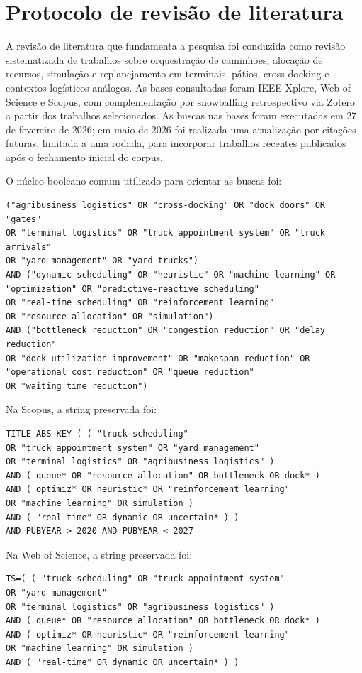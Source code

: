 \documentclass[
  12pt,
  oneside,
  a4paper,
  sumario=tradicional,
  brazil
]{abntex2}
\begin{document}
\section{Protocolo de revisão de literatura}
A revis\~ao de literatura que fundamenta a pesquisa foi conduzida como revis\~ao sistematizada de trabalhos sobre orquestra\c{c}\~ao de caminh\~oes, aloca\c{c}\~ao de recursos, simula\c{c}\~ao e replanejamento em terminais, p\'atios, cross-docking e contextos log\'isticos an\'alogos. As bases consultadas foram IEEE Xplore, Web of Science e Scopus, com complementa\c{c}\~ao por snowballing retrospectivo via Zotero a partir dos trabalhos selecionados. As buscas nas bases foram executadas em 27 de fevereiro de 2026; em maio de 2026 foi realizada uma atualiza\c{c}\~ao por cita\c{c}\~oes futuras, limitada a uma rodada, para incorporar trabalhos recentes publicados ap\'os o fechamento inicial do corpus.

O n\'ucleo booleano comum utilizado para orientar as buscas foi:
{\scriptsize
\begin{verbatim}
("agribusiness logistics" OR "cross-docking" OR "dock doors" OR "gates"
OR "terminal logistics" OR "truck appointment system" OR "truck arrivals"
OR "yard management" OR "yard trucks")
AND ("dynamic scheduling" OR "heuristic" OR "machine learning" OR
"optimization" OR "predictive-reactive scheduling"
OR "real-time scheduling" OR "reinforcement learning"
OR "resource allocation" OR "simulation")
AND ("bottleneck reduction" OR "congestion reduction" OR "delay reduction"
OR "dock utilization improvement" OR "makespan reduction" OR
"operational cost reduction" OR "queue reduction"
OR "waiting time reduction")
\end{verbatim}
}

Na Scopus, a string preservada foi:
{\scriptsize
\begin{verbatim}
TITLE-ABS-KEY ( ( "truck scheduling"
OR "truck appointment system" OR "yard management"
OR "terminal logistics" OR "agribusiness logistics" )
AND ( queue* OR "resource allocation" OR bottleneck OR dock* )
AND ( optimiz* OR heuristic* OR "reinforcement learning"
OR "machine learning" OR simulation )
AND ( "real-time" OR dynamic OR uncertain* ) )
AND PUBYEAR > 2020 AND PUBYEAR < 2027
\end{verbatim}
}

Na Web of Science, a string preservada foi:
{\scriptsize
\begin{verbatim}
TS=( ( "truck scheduling" OR "truck appointment system"
OR "yard management"
OR "terminal logistics" OR "agribusiness logistics" )
AND ( queue* OR "resource allocation" OR bottleneck OR dock* )
AND ( optimiz* OR heuristic* OR "reinforcement learning"
OR "machine learning" OR simulation )
AND ( "real-time" OR dynamic OR uncertain* ) )
\end{verbatim}
}
\end{document}
